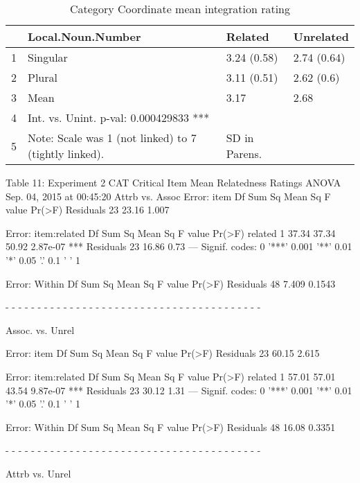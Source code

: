 \documentclass[a4paper,11pt]{article}\usepackage[]{graphicx}\usepackage[]{color}
\begin{document}
\begin{table}[ht]
\centering
\begin{tabular}{rlll}
  \hline
 & Local.Noun.Number & Related & Unrelated \\ 
  \hline
1 & Singular & 3.24 (0.58) & 2.74 (0.64) \\ 
  2 & Plural & 3.11 (0.51) & 2.62 (0.6) \\ 
  3 & Mean & 3.17 & 2.68 \\ 
  4 & Int. vs. Unint. p-val: 0.000429833 *** &   &   \\ 
  5 & Note: Scale was 1 (not linked) to 7 (tightly linked). & SD in Parens. &   \\ 
   \hline
\end{tabular}
\caption[CAT COORD Integration]{Category Coordinate mean integration rating} 
\end{table}


Table 11: Experiment 2 CAT Critical Item Mean Relatedness Ratings ANOVA
Sep. 04, 2015 at 00:45:20
Attrb vs. Assoc
Error: item
          Df Sum Sq Mean Sq F value Pr(>F)
Residuals 23  23.16   1.007               

Error: item:related
          Df Sum Sq Mean Sq F value   Pr(>F)    
related    1  37.34   37.34   50.92 2.87e-07 ***
Residuals 23  16.86    0.73                     
---
Signif. codes:  0 '***' 0.001 '**' 0.01 '*' 0.05 '.' 0.1 ' ' 1

Error: Within
          Df Sum Sq Mean Sq F value Pr(>F)
Residuals 48  7.409  0.1543               

 
 - - - - - - - - - - - - - - - - - - - - - - - - - - - - - - - - - - - - - - - - 
 
 Assoc. vs. Unrel 
 

Error: item
          Df Sum Sq Mean Sq F value Pr(>F)
Residuals 23  60.15   2.615               

Error: item:related
          Df Sum Sq Mean Sq F value   Pr(>F)    
related    1  57.01   57.01   43.54 9.87e-07 ***
Residuals 23  30.12    1.31                     
---
Signif. codes:  0 '***' 0.001 '**' 0.01 '*' 0.05 '.' 0.1 ' ' 1

Error: Within
          Df Sum Sq Mean Sq F value Pr(>F)
Residuals 48  16.08  0.3351               

 
 - - - - - - - - - - - - - - - - - - - - - - - - - - - - - - - - - - - - - - - - 
 
 Attrb vs. Unrel 
 
\end{document}
